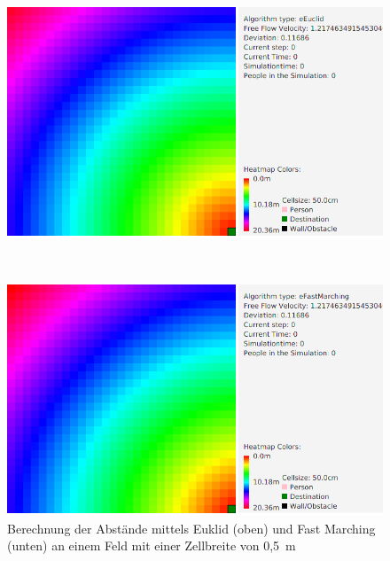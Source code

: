 \begin{figure}
\centering
\begin{minipage}{1\textwidth}
\centering
  \includegraphics[width=1\linewidth]{abbildungen/vergleich_euklid_fast_marching/eEuclid_0_05m.png}
\end{minipage}%
\\
\begin{minipage}{1\textwidth}
\centering
  \includegraphics[width=\linewidth]{abbildungen/vergleich_euklid_fast_marching/eFastMarching_0_05m.png}
\end{minipage}
\caption{Berechnung der Abstände mittels Euklid (oben) und Fast Marching (unten) an einem Feld mit einer Zellbreite von 0,5\ m}
\label{fig_euklid_fast_marching_0_05m_cellsize}
\end{figure}

